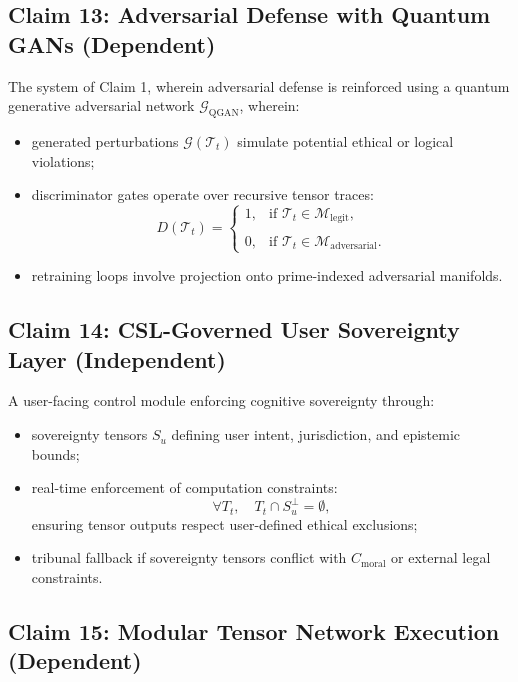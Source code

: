 \documentclass[12pt]{article}
\begin{document}
\subsection*{Claim 13: Adversarial Defense with Quantum GANs (Dependent)}

The system of Claim 1, wherein adversarial defense is reinforced using a quantum generative adversarial network \( \mathcal{G}_{\text{QGAN}} \), wherein:

\begin{itemize}
    \item generated perturbations \( \mathcal{G}(\mathcal{T}_t) \) simulate potential ethical or logical violations;
    \item discriminator gates operate over recursive tensor traces:
    \[
    D(\mathcal{T}_t) = \begin{cases}
        1, & \text{if } \mathcal{T}_t \in \mathcal{M}_{\text{legit}}, \\\\
        0, & \text{if } \mathcal{T}_t \in \mathcal{M}_{\text{adversarial}}.
    \end{cases}
    \]
    \item retraining loops involve projection onto prime-indexed adversarial manifolds.
\end{itemize}

\subsection*{Claim 14: CSL-Governed User Sovereignty Layer (Independent)}

A user-facing control module enforcing cognitive sovereignty through:

\begin{itemize}
    \item sovereignty tensors \( S_u \) defining user intent, jurisdiction, and epistemic bounds;
    \item real-time enforcement of computation constraints:
    \[
    \forall T_t, \quad T_t \cap S_u^\perp = \emptyset,
    \]
    ensuring tensor outputs respect user-defined ethical exclusions;
    \item tribunal fallback if sovereignty tensors conflict with \( C_{\text{moral}} \) or external legal constraints.
\end{itemize}

\subsection*{Claim 15: Modular Tensor Network Execution (Dependent)}
\end{document}
